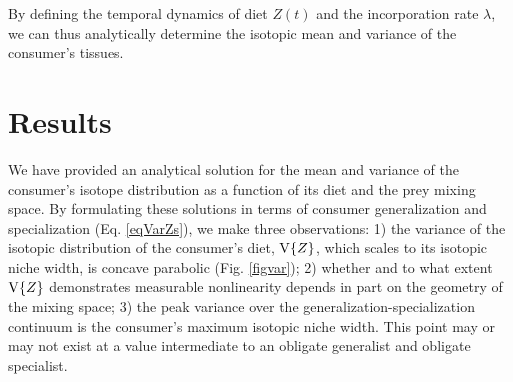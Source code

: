 \documentclass{article}
\begin{document}
\noindent By defining the temporal dynamics of diet $Z(t)$ and the incorporation rate $\lambda$, we can thus analytically determine the isotopic mean and variance of the consumer's tissues.







\section{Results}



We have provided an analytical solution for the mean and variance of the consumer's isotope distribution as a function of its diet and the prey mixing space.
By formulating these solutions in terms of consumer generalization and specialization (Eq. \ref{eqVarZs}), we make three observations:
1) the variance of the isotopic distribution of the consumer's diet, ${\rm V}\{Z\}$, which scales to its isotopic niche width, is concave parabolic (Fig. \ref{figvar});
2) whether and to what extent ${\rm V}\{Z\}$ demonstrates measurable nonlinearity depends in part on the geometry of the mixing space;
3) the peak variance over the generalization-specialization continuum is the consumer's maximum isotopic niche width.
This point may or may not exist at a value intermediate to an obligate generalist and obligate specialist.
\end{document}
